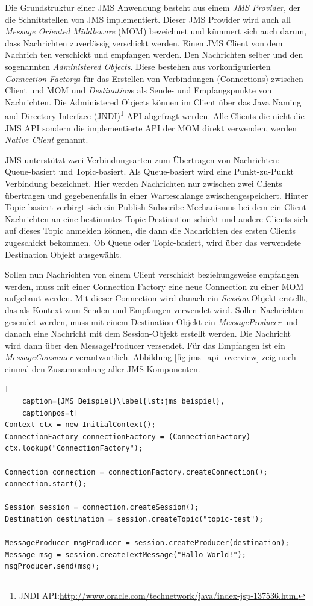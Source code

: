 Die Grundstruktur einer JMS Anwendung besteht aus einem \emph{JMS Provider}, der die Schnittstellen von JMS implementiert. Dieser JMS Provider wird auch all  \emph{Message Oriented Middleware} (MOM) bezeichnet und kümmert sich auch darum, dass Nachrichten zuverlässig verschickt werden. Einen JMS Client von dem Nachrich
ten verschickt und empfangen werden. Den Nachrichten selber und den sogenannten \emph{Administered Objects}. Diese bestehen aus vorkonfigurierten \emph{Connection Factory}s für das Erstellen von Verbindungen (Connections) zwischen Client und MOM und \emph{Destination}s als Sende- und Empfangspunkte von Nachrichten. Die Administered Objects können im Client über das Java Naming and Directory Interface (JNDI)\footnote{JNDI API:\url{http://www.oracle.com/technetwork/java/index-jsp-137536.html}} API abgefragt werden. Alle Clients die nicht die JMS API sondern die implementierte API der MOM direkt verwenden, werden \emph{Native Client} genannt.

JMS unterstützt zwei Verbindungsarten zum Übertragen von Nachrichten: Queue-basiert und Topic-basiert. Als Queue-basiert wird eine Punkt-zu-Punkt Verbindung bezeichnet. Hier werden Nachrichten nur zwischen zwei Clients übertragen und gegebenenfalls in einer Warteschlange zwischengespeichert. Hinter Topic-basiert verbirgt sich ein Publish-Subscribe Mechanismus bei dem ein Client Nachrichten an eine bestimmtes Topic-Destination schickt und andere Clients sich auf dieses Topic anmelden können, die dann die Nachrichten des ersten Clients zugeschickt bekommen. Ob Queue oder Topic-basiert, wird über das verwendete Destination Objekt ausgewählt.

Sollen nun Nachrichten von einem Client verschickt beziehungsweise empfangen werden, muss mit einer Connection Factory eine neue Connection zu einer MOM aufgebaut werden. Mit dieser Connection wird danach ein \emph{Session}-Objekt erstellt, das als Kontext zum Senden und Empfangen verwendet wird. Sollen Nachrichten gesendet werden, muss mit einem Destination-Objekt ein \emph{MessageProducer} und danach eine Nachricht mit dem Session-Objekt erstellt werden. Die Nachricht wird dann über den MessageProducer versendet. Für das Empfangen ist ein \emph{MessageConsumer} verantwortlich. Abbildung \ref{fig:jms_api_overview} zeig noch einmal den Zusammenhang aller JMS Komponenten.

\begin{lstlisting}[
    caption={JMS Beispiel}\label{lst:jms_beispiel},
    captionpos=t]
Context ctx = new InitialContext();
ConnectionFactory connectionFactory = (ConnectionFactory) ctx.lookup("ConnectionFactory");

Connection connection = connectionFactory.createConnection();
connection.start();

Session session = connection.createSession();
Destination destination = session.createTopic("topic-test");

MessageProducer msgProducer = session.createProducer(destination);
Message msg = session.createTextMessage("Hallo World!");
msgProducer.send(msg);
\end{lstlisting}

